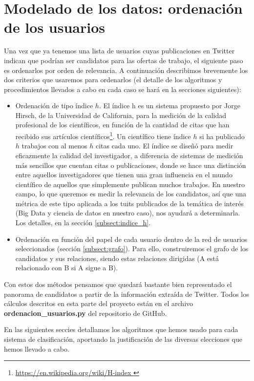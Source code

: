 \chapter{Modelado de los datos: ordenación de los usuarios}
\label{chap:ordenacion_de_usuarios}

Una vez que ya tenemos una lista de usuarios cuyas publicaciones en Twitter
indican que podrían ser candidatos para las ofertas de trabajo, el siguiente
paso es ordenarlos por orden de relevancia. A continuación describimos brevemente
los dos criterios que usaremos para ordenarlos (el detalle de los algoritmos y 
procedimientos llevados a cabo en cada caso se hará en la secciones siguientes):
\begin{itemize}
\item Ordenación de tipo índice $h$. El índice h es un sistema propuesto por Jorge Hirsch, de la Universidad de California, para la medición de la calidad profesional de los científicos, en función de la cantidad de citas que han recibido sus artículos científicos\footnote{\url{https://en.wikipedia.org/wiki/H-index }}. Un científico tiene índice $h$ si ha publicado $h$ trabajos con al menos $h$ citas cada uno. El índice se diseñó para medir eficazmente la calidad del investigador, a diferencia de sistemas de medición más sencillos que cuentan citas o publicaciones, donde se hace una distinción entre aquellos investigadores que tienen una gran influencia en el mundo científico de aquellos que simplemente publican muchos trabajos. En nuestro campo, lo que queremos es medir 
la relevancia de los candidatos, así que una métrica de este tipo aplicada a los tuits publicados
de la temática de interés (Big Data y ciencia de datos en nuestro caso), nos ayudará a determinarla.
Los detalles, en la sección \ref{subsect:indice_h}.

\item Ordenación en función del papel de cada usuario dentro de la red de usuarios
seleccionados (sección \ref{subsect:grafo}). Para ello, construiremos el grafo 
de los candidatos y sus relaciones, siendo estas relaciones dirigidas (A está relacionado
con B si A sigue a B).
\end{itemize}

Con estos dos métodos pensamos que quedará bastante bien representado el panorama
de candidatos a partir de la información extraída de Twitter. 
Todos los cálculos descritos en esta parte del proyecto están en el archivo
{\bf ordenacion\_usuarios.py} del repositorio de GitHub.

En las siguientes seccies detallamos los algoritmos que hemos usado para cada sistema de
clasificación, aportando la justificación de las diversas elecciones que 
hemos llevado a cabo.

